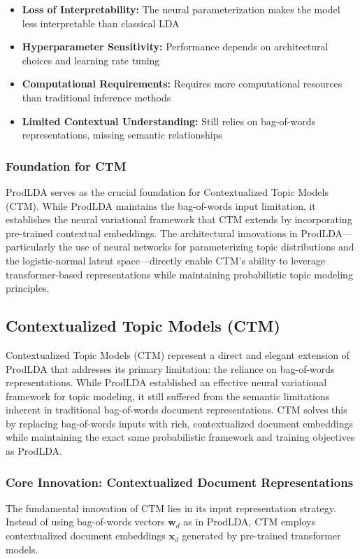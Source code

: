 \documentclass[12pt]{article}
\begin{document}
\begin{itemize}
    \item \textbf{Loss of Interpretability:} The neural parameterization makes the model less interpretable than classical LDA
    \item \textbf{Hyperparameter Sensitivity:} Performance depends on architectural choices and learning rate tuning
    \item \textbf{Computational Requirements:} Requires more computational resources than traditional inference methods
    \item \textbf{Limited Contextual Understanding:} Still relies on bag-of-words representations, missing semantic relationships
\end{itemize}

\subsubsection{Foundation for CTM}
ProdLDA serves as the crucial foundation for Contextualized Topic Models (CTM).
While ProdLDA maintains the bag-of-words input limitation, it establishes the
neural variational framework that CTM extends by incorporating pre-trained
contextual embeddings. The architectural innovations in ProdLDA—particularly
the use of neural networks for parameterizing topic distributions and the
logistic-normal latent space—directly enable CTM's ability to leverage
transformer-based representations while maintaining probabilistic topic
modeling principles.

\subsection{Contextualized Topic Models (CTM)}
Contextualized Topic Models (CTM) \cite{bianchi2021cross} represent a direct
and elegant extension of ProdLDA that addresses its primary limitation: the
reliance on bag-of-words representations. While ProdLDA established an
effective neural variational framework for topic modeling, it still suffered
from the semantic limitations inherent in traditional bag-of-words document
representations. CTM solves this by replacing bag-of-words inputs with rich,
contextualized document embeddings while maintaining the exact same
probabilistic framework and training objectives as ProdLDA.

\subsubsection{Core Innovation: Contextualized Document Representations}
The fundamental innovation of CTM lies in its input representation strategy.
Instead of using bag-of-words vectors $\mathbf{w}_d$ as in ProdLDA, CTM employs
contextualized document embeddings $\mathbf{x}_d$ generated by pre-trained
transformer models.
\end{document}
